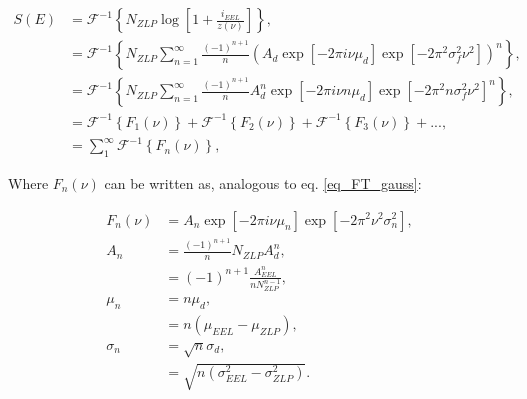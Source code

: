 \begin{equation}\label{eq_S_gauss_verder}
\begin{aligned}
S(E) &= \mathcal{F}^{-1}\left\{N_{ZLP}\operatorname{log}\left[1+ \frac{i_{EEL}}{z(\nu)}\right]\right\},\\
&= \mathcal{F}^{-1}\left\{ N_{ZLP} \sum_{n=1}^\infty \frac{(-1)^{n+1}}{n} \left(A_d \exp{[-2\pi i \nu \mu_d]} \exp{\left[ -2\pi^2 \sigma_f^2 \nu^2 \right]}\right)^n  \right\},\\
&= \mathcal{F}^{-1}\left\{ N_{ZLP} \sum_{n=1}^\infty \frac{(-1)^{n+1}}{n} A_d^n \exp{[-2\pi i \nu n \mu_d]} \exp{\left[ -2\pi^2 n \sigma_f^2 \nu^2 \right]}^n  \right\},\\
&= \mathcal{F}^{-1}\left\{ F_1(\nu) \right\} + \mathcal{F}^{-1}\left\{ F_2(\nu) \right\} + \mathcal{F}^{-1}\left\{ F_3(\nu) \right\} + ... , \\
&= \sum_1^{\infty} \mathcal{F}^{-1}\left\{ F_n(\nu) \right\} ,
\end{aligned}
\end{equation}




Where $F_n(\nu)$ can be written as, analogous to eq. \eqref{eq_FT_gauss}:

\begin{equation}
    \begin{aligned}
F_n (\nu)&= A_{n}\exp{[-2\pi i \nu \mu_n]} \exp{[-2\pi^2 \nu^2 \sigma_{n}^2]},\\
A_{n} &= \frac{(-1)^{n+1}}{n} N_{ZLP}A_d^n,\\
&= (-1)^{n+1} \frac{A_{EEL}^n}{n N_{ZLP}^{n-1}}, \\
\mu_n &= n\mu_d,\\
&= n(\mu_{EEL} - \mu_{ZLP}), \\
\sigma_{n} &= \sqrt{n}\sigma_d, \\
&= \sqrt{n(\sigma_{EEL}^2 - \sigma_{ZLP}^2)}.
    \end{aligned}
\end{equation}



